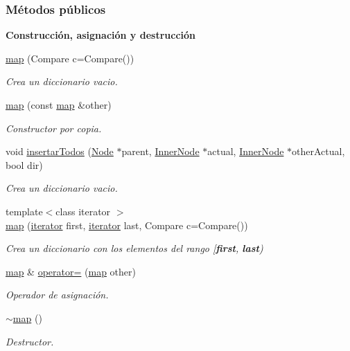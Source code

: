 \subsubsection*{Métodos públicos}
\begin{Indent}{\bf Construcción, asignación y destrucción}\par
\begin{DoxyCompactItemize}
\item 
\hyperlink{classaed2_1_1map_a64da1d965b13eb28cdb3837bc17a18cf_a64da1d965b13eb28cdb3837bc17a18cf}{map} (Compare c=Compare())
\begin{DoxyCompactList}\small\item\em Crea un diccionario vacio. \end{DoxyCompactList}\item 
\hyperlink{classaed2_1_1map_a7a77950a3d8e637bfa7cf5dcd904f257_a7a77950a3d8e637bfa7cf5dcd904f257}{map} (const \hyperlink{classaed2_1_1map}{map} \&other)
\begin{DoxyCompactList}\small\item\em Constructor por copia. \end{DoxyCompactList}\item 
void \hyperlink{classaed2_1_1map_ae8d1abe96377377380da1ce5871a5dfe_ae8d1abe96377377380da1ce5871a5dfe}{insertar\+Todos} (\hyperlink{structaed2_1_1map_1_1Node}{Node} $\ast$parent, \hyperlink{structaed2_1_1map_1_1InnerNode}{Inner\+Node} $\ast$actual, \hyperlink{structaed2_1_1map_1_1InnerNode}{Inner\+Node} $\ast$other\+Actual, bool dir)
\begin{DoxyCompactList}\small\item\em Crea un diccionario vacio. \end{DoxyCompactList}\item 
{\footnotesize template$<$class iterator $>$ }\\\hyperlink{classaed2_1_1map_a5d336f3248572beb56be383dcc95cfeb_a5d336f3248572beb56be383dcc95cfeb}{map} (\hyperlink{classaed2_1_1map_1_1iterator}{iterator} first, \hyperlink{classaed2_1_1map_1_1iterator}{iterator} last, Compare c=Compare())
\begin{DoxyCompactList}\small\item\em Crea un diccionario con los elementos del rango \mbox{[}{\bfseries first}, {\bfseries last}) \end{DoxyCompactList}\item 
\hyperlink{classaed2_1_1map}{map} \& \hyperlink{classaed2_1_1map_ac606d334809066929522964d45e76317_ac606d334809066929522964d45e76317}{operator=} (\hyperlink{classaed2_1_1map}{map} other)
\begin{DoxyCompactList}\small\item\em Operador de asignación. \end{DoxyCompactList}\item 
\hyperlink{classaed2_1_1map_ab22c9a85c2dadbc286cd30e97069a8e6_ab22c9a85c2dadbc286cd30e97069a8e6}{$\sim$map} ()
\begin{DoxyCompactList}\small\item\em Destructor. \end{DoxyCompactList}\end{DoxyCompactItemize}
\end{Indent}
